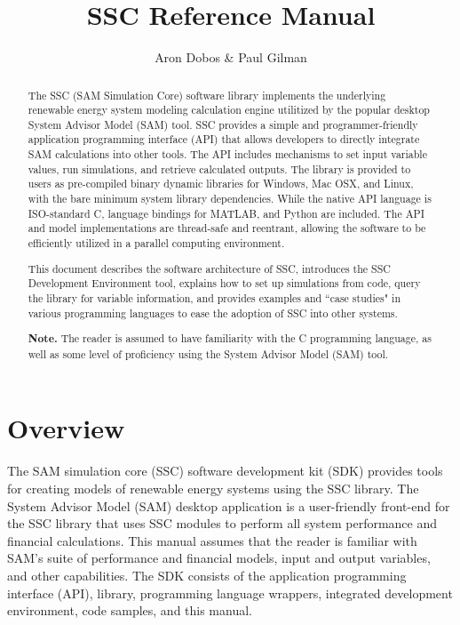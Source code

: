 \documentclass{article}
\title{SSC Reference Manual}
\author{Aron Dobos \& Paul Gilman}
\begin{document}
\maketitle
\vspace{2.5in}
\begin{abstract}
The SSC (SAM Simulation Core) software library implements the underlying renewable energy system modeling calculation engine utilitized by the popular desktop System Advisor Model (SAM) tool.  SSC provides a simple and programmer-friendly application programming interface (API) that allows developers to directly integrate SAM calculations into other tools.  The API includes mechanisms to set input variable values, run simulations, and retrieve calculated outputs.  The library is provided to users as pre-compiled binary dynamic libraries for Windows, Mac OSX, and Linux, with the bare minimum system library dependencies.  While the native API language is ISO-standard C, language bindings for MATLAB, and Python are included.  The API and model implementations are thread-safe and reentrant, allowing the software to be efficiently utilized in a parallel computing environment.

This document describes the software architecture of SSC, introduces the SSC Development Environment tool, explains how to set up simulations from code, query the library for variable information, and provides examples and ``case studies" in various programming languages to ease the adoption of SSC into other systems.  

\textbf{Note.} The reader is assumed to have familiarity with the C programming language, as well as some level of proficiency using the System Advisor Model (SAM) tool.
\end{abstract} 

\newpage
\tableofcontents
\newpage

\section{Overview}
\label{sec_overview}

The SAM simulation core (SSC) software development kit (SDK) provides tools for creating models of renewable energy systems using the SSC library. The System Advisor Model (SAM) desktop application is a user-friendly front-end for the SSC library that uses SSC modules to perform all system performance and financial calculations. This manual assumes that the reader is familiar with SAM's suite of performance and financial models, input and output variables, and other capabilities. The SDK consists of the application programming interface (API), library, programming language wrappers, integrated development environment, code samples, and this manual.
\end{document}

